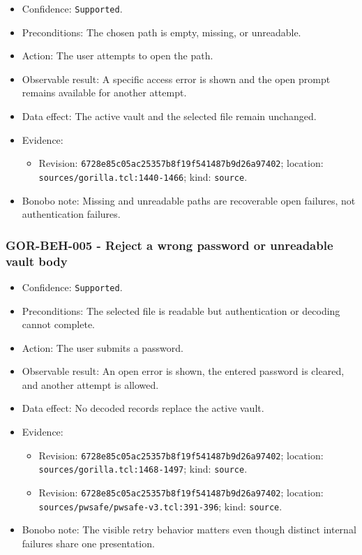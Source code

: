 \documentclass[
  letterpaper,
]{article}
\newcommand{\passthrough}[1]{#1}
\providecommand{\tightlist}{%
  \setlength{\itemsep}{0pt}\setlength{\parskip}{0pt}}
\begin{document}
\begin{itemize}
\tightlist
\item
  Confidence: \passthrough{\lstinline!Supported!}.
\item
  Preconditions: The chosen path is empty, missing, or unreadable.
\item
  Action: The user attempts to open the path.
\item
  Observable result: A specific access error is shown and the open prompt remains available for another attempt.
\item
  Data effect: The active vault and the selected file remain unchanged.
\item
  Evidence:

  \begin{itemize}
  \tightlist
  \item
    Revision: \nolinkurl{6728e85c05ac25357b8f19f541487b9d26a97402}; location: \nolinkurl{sources/gorilla.tcl:1440-1466};
    kind: \passthrough{\lstinline!source!}.
  \end{itemize}
\item
  Bonobo note: Missing and unreadable paths are recoverable open failures, not authentication failures.
\end{itemize}

\subsubsection{GOR-BEH-005 - Reject a wrong password or unreadable vault
body}\label{gor-beh-005---reject-a-wrong-password-or-unreadable-vault-body}

\begin{itemize}
\tightlist
\item
  Confidence: \passthrough{\lstinline!Supported!}.
\item
  Preconditions: The selected file is readable but authentication or decoding cannot complete.
\item
  Action: The user submits a password.
\item
  Observable result: An open error is shown, the entered password is cleared, and another attempt is allowed.
\item
  Data effect: No decoded records replace the active vault.
\item
  Evidence:

  \begin{itemize}
  \tightlist
  \item
    Revision: \nolinkurl{6728e85c05ac25357b8f19f541487b9d26a97402}; location: \nolinkurl{sources/gorilla.tcl:1468-1497};
    kind: \passthrough{\lstinline!source!}.
  \item
    Revision: \nolinkurl{6728e85c05ac25357b8f19f541487b9d26a97402}; location:
    \nolinkurl{sources/pwsafe/pwsafe-v3.tcl:391-396}; kind: \passthrough{\lstinline!source!}.
  \end{itemize}
\item
  Bonobo note: The visible retry behavior matters even though distinct internal failures share one presentation.
\end{itemize}
\end{document}
